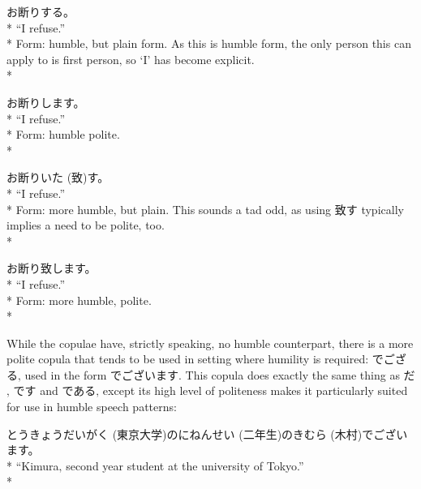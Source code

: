\documentclass[11pt, b5paper, twoside, openright, onecolumn]{book}
\makeatletter
\newcommand*{\rubystack}[2]{{\relscale{0.5}%
  \begin{tabular}[b]{@{}c@{}}%
    {#1}\\%
   {\textscale{2}{#2}}%
  \end{tabular}}%
}
\DeclareRobustCommand*{\ruby}[2]{%
  \mbox{%
    \setlength{\parskip}{0ex}%
    \BeginAccSupp{method=pdfstringdef,ActualText={#1}}%
      \rubystack{\phantom{#2}}{#1}%
      \llap{%
        \rubystack{#2}{\phantom{#1}}%
      }%
    \EndAccSupp{}%
  }%
}
\renewcommand*{\ruby}[2]{#2 (#1)}%
\newenvironment{exampleblock}{
\setlength{\parindent}{0.6in}
\begin{minipage}[t]{\dimexpr\textwidth-\parindent}}
{\end{minipage}}
\makeatother
\begin{document}
\begin{exampleblock}
お断りする。 \\* 
“I refuse.” \\* 
Form: humble‚ but plain form. As this is humble form‚ the only person this can apply to is first person‚ so ‘I’ has become explicit. \\* 
\end{exampleblock}
\vspace{0.2cm}

\begin{exampleblock}
お断りします。 \\* 
“I refuse.” \\* 
Form: humble polite. \\* 
\end{exampleblock}
\vspace{0.2cm}

\begin{exampleblock}
お断り\ruby{致}{いた}す。 \\* 
“I refuse.” \\* 
Form: more humble‚ but plain. This sounds a tad odd‚ as using 致す typically implies a need to be polite‚ too. \\* 
\end{exampleblock}
\vspace{0.2cm}

\begin{exampleblock}
お断り致します。 \\* 
“I refuse.” \\* 
Form: more humble‚ polite. \\* 
\end{exampleblock}
\vspace{0.2cm}

While the copulae have‚ strictly speaking‚ no humble counterpart‚ there is a more polite copula that tends to be used in setting where humility is required: でござる‚ used in the form でございます. This copula does exactly the same thing as だ‚ です and である‚ except its high level of politeness makes it particularly suited for use in humble speech patterns:

\vspace{0.4cm}
\begin{exampleblock}
\ruby{東京大学}{とうきょうだいがく}の\ruby{二年生}{にねんせい}の\ruby{木村}{きむら}でございます。 \\* 
“Kimura‚ second year student at the university of Tokyo.” \\* 
\end{exampleblock}
\vspace{0.2cm}
\end{document}
